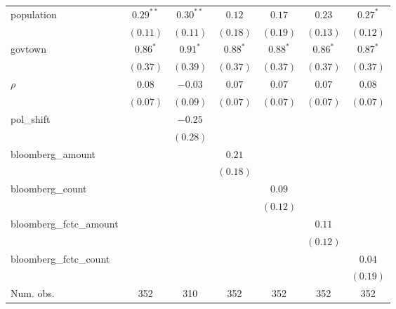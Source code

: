 \begin{table}[!h]
\begin{center}
\begin{tabular}{l c c c c c c }
population              & $0.29^{**}$  & $0.30^{**}$  & $0.12$       & $0.17$       & $0.23$       & $0.27^{*}$   \\
                        & $(0.11)$     & $(0.11)$     & $(0.18)$     & $(0.19)$     & $(0.13)$     & $(0.12)$     \\
govtown                 & $0.86^{*}$   & $0.91^{*}$   & $0.88^{*}$   & $0.88^{*}$   & $0.86^{*}$   & $0.87^{*}$   \\
                        & $(0.37)$     & $(0.39)$     & $(0.37)$     & $(0.37)$     & $(0.37)$     & $(0.37)$     \\
$\rho$                  & $0.08$       & $-0.03$      & $0.07$       & $0.07$       & $0.07$       & $0.08$       \\
                        & $(0.07)$     & $(0.09)$     & $(0.07)$     & $(0.07)$     & $(0.07)$     & $(0.07)$     \\
pol\_shift              &              & $-0.25$      &              &              &              &              \\
                        &              & $(0.28)$     &              &              &              &              \\
bloomberg\_amount       &              &              & $0.21$       &              &              &              \\
                        &              &              & $(0.18)$     &              &              &              \\
bloomberg\_count        &              &              &              & $0.09$       &              &              \\
                        &              &              &              & $(0.12)$     &              &              \\
bloomberg\_fctc\_amount &              &              &              &              & $0.11$       &              \\
                        &              &              &              &              & $(0.12)$     &              \\
bloomberg\_fctc\_count  &              &              &              &              &              & $0.04$       \\
                        &              &              &              &              &              & $(0.19)$     \\
\midrule
Num. obs.               & 352          & 310          & 352          & 352          & 352          & 352          \\

\end{tabular}
\end{center}
\end{table}
